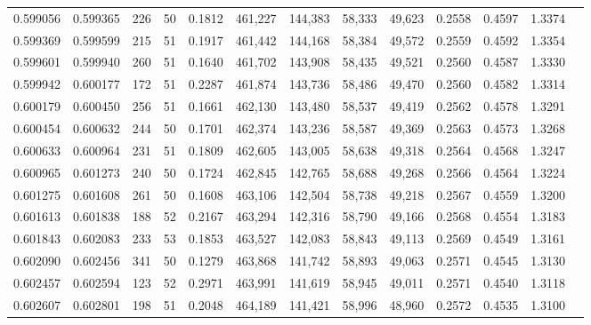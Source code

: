 \begin{tabular}{rrrrrrrrrrrrr}
0.599056 & 0.599365 &   226 &  50 &                                     0.1812 & 461,227 & 144,383 &  58,333 &  49,623 & 0.2558 & 0.4597 & 1.3374 \\
0.599369 & 0.599599 &   215 &  51 &                                     0.1917 & 461,442 & 144,168 &  58,384 &  49,572 & 0.2559 & 0.4592 & 1.3354 \\
0.599601 & 0.599940 &   260 &  51 &                                     0.1640 & 461,702 & 143,908 &  58,435 &  49,521 & 0.2560 & 0.4587 & 1.3330 \\
0.599942 & 0.600177 &   172 &  51 &                                     0.2287 & 461,874 & 143,736 &  58,486 &  49,470 & 0.2560 & 0.4582 & 1.3314 \\
0.600179 & 0.600450 &   256 &  51 &                                     0.1661 & 462,130 & 143,480 &  58,537 &  49,419 & 0.2562 & 0.4578 & 1.3291 \\
0.600454 & 0.600632 &   244 &  50 &                                     0.1701 & 462,374 & 143,236 &  58,587 &  49,369 & 0.2563 & 0.4573 & 1.3268 \\
0.600633 & 0.600964 &   231 &  51 &                                     0.1809 & 462,605 & 143,005 &  58,638 &  49,318 & 0.2564 & 0.4568 & 1.3247 \\
0.600965 & 0.601273 &   240 &  50 &                                     0.1724 & 462,845 & 142,765 &  58,688 &  49,268 & 0.2566 & 0.4564 & 1.3224 \\
0.601275 & 0.601608 &   261 &  50 &                                     0.1608 & 463,106 & 142,504 &  58,738 &  49,218 & 0.2567 & 0.4559 & 1.3200 \\
0.601613 & 0.601838 &   188 &  52 &                                     0.2167 & 463,294 & 142,316 &  58,790 &  49,166 & 0.2568 & 0.4554 & 1.3183 \\
0.601843 & 0.602083 &   233 &  53 &                                     0.1853 & 463,527 & 142,083 &  58,843 &  49,113 & 0.2569 & 0.4549 & 1.3161 \\
0.602090 & 0.602456 &   341 &  50 &                                     0.1279 & 463,868 & 141,742 &  58,893 &  49,063 & 0.2571 & 0.4545 & 1.3130 \\
0.602457 & 0.602594 &   123 &  52 &                                     0.2971 & 463,991 & 141,619 &  58,945 &  49,011 & 0.2571 & 0.4540 & 1.3118 \\
0.602607 & 0.602801 &   198 &  51 &                                     0.2048 & 464,189 & 141,421 &  58,996 &  48,960 & 0.2572 & 0.4535 & 1.3100 \\

\end{tabular}
